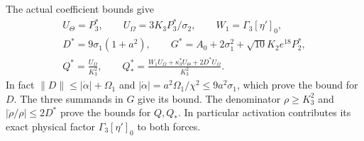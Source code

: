 The actual coefficient bounds give
\begin{equation}\label{tgs:coefficientbounds}
 \begin{gathered}
 U_\Theta=P_3^*,\qquad U_\Omega=3K_3P_3^*/\sigma_2,
 \qquad W_1=\Gamma_3[\eta']_0,\\
 D^*=9\sigma_1(1+a^2),\qquad
 G^*=A_0+2\sigma_1^2+\sqrt{10}K_2e^{18}P_2^*,\\
 Q^*=\frac{U_\Omega}{K_3^2},\qquad
 Q_*^*=\frac{W_1U_\Omega+\kappa_3^*U_\Theta+2D^*U_\Omega}{K_3^2}.
 \end{gathered}
\end{equation}
In fact $\|D\|\leq|\dot\alpha|+\Omega_1$ and
$|\dot\alpha|=a^2\Omega_1/\chi^2\leq9a^2\sigma_1$,
which prove the bound for $D$. The three summands in $G$
give its bound. The denominator $\rho\geq K_3^2$ and
$|\dot\rho/\rho|\leq2D^*$ prove the bounds for $Q,Q_*$.
In particular activation contributes its exact physical factor
$\Gamma_3[\eta']_0$ to both forces.

